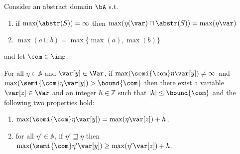 \begin{lemma}
  \label{le:inc}
  Consider an abstract domain \(\bA\) s.t.
  \begin{enumerate}[label=(\Roman*)]
  \item\label{inc:hp1} if \(\max(\abstr(S)) = \infty\) then
    \(\max(\eta(\var) \sqcap \abstr(S)) = \max(\eta\var)\)
  \item\label{inc:hp2} \(\max(a \sqcup b) = \max\{\max(a), \max(b)\}\)
  \end{enumerate}
  and let \(\com\in \imp\). %
  
  \noindent
  For all \(\eta \in \mathbb{A}\) and \(\var[y] \in \Var\), if
  \(\max(\semi{\com} \eta \var[y]) \neq \infty\) and
  \(\max(\semi{\com}\eta \var[y]) > \bound{\com}\) then there exist a
  variable \(\var[z] \in \Var\) and an integer \(h \in \mathbb{Z}\)
  such that \(|h| \leq \bound{\com}\) and the following two properties
  hold:
  \begin{enumerate}[label=(\roman*)]
  \item \(\max(\semi{\com}\eta \var[y]) = \max(\eta \var[z]) + h\); \label{point1}
  \item  for all \(\eta' \in \mathbb{A}\), if \(\eta' \sqsupseteq \eta\)
    then
    \(\max(\semi{\com}\eta' \var[y]) \geq \max(\eta' \var[z]) + h\). \label{point2}
  \end{enumerate}
\end{lemma}


